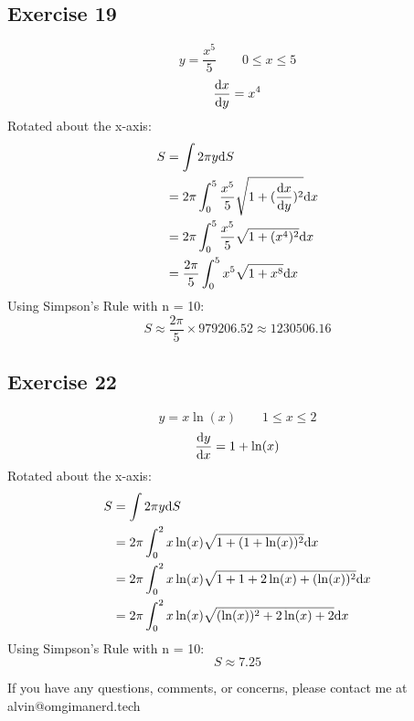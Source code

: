 \documentclass[letterpaper, 12pt]{math}
\begin{document}
\subsection*{Exercise 19}
\[ y = \frac{x^{5}}{5} \quad \quad 0 \leq x \leq 5 \]
\[ \frac{\mathrm{d}{x}}{\mathrm{d}{y}} = x^{4} \]
Rotated about the x-axis:
\begin{align*}
  S &= \int{2\pi y\mathrm{d}{S}} \\
  &= 2\pi\int_{0}^{5}{
    \frac{x^{5}}{5}\sqrt{1+(\frac{\mathrm{d}{x}}{\mathrm{d}{y}})^{2}}\mathrm{d}{x}} \\
  &= 2\pi\int_{0}^{5}{\frac{x^{5}}{5}\sqrt{1+(x^{4})^{2}}\mathrm{d}{x}} \\
  &= \frac{2\pi}{5}\int_{0}^{5}{x^{5}\sqrt{1+x^{8}}\mathrm{d}{x}} \\
\end{align*}
Using Simpson's Rule with n = 10:
\[ S \approx \frac{2\pi}{5} \times 979206.52 \approx 1230506.16 \]

\subsection*{Exercise 22}
\[ y = x\ln(x) \quad \quad 1 \leq x \leq 2 \]
\[ \frac{\mathrm{d}{y}}{\mathrm{d}{x}} = 1+\ln(x) \]
Rotated about the x-axis:
\begin{align*}
  S &= \int{2\pi y\mathrm{d}{S}} \\
  &= 2\pi\int_{0}^{2}{x\ln(x)\sqrt{1+(1+\ln(x))^{2}}\mathrm{d}{x}} \\
  &= 2\pi\int_{0}^{2}{x\ln(x)\sqrt{1+1+2\ln(x)+(\ln(x))^{2}}\mathrm{d}{x}} \\
  &= 2\pi\int_{0}^{2}{x\ln(x)\sqrt{(\ln(x))^{2}+2\ln(x)+2}\mathrm{d}{x}}
\end{align*}
Using Simpson's Rule with n = 10:
\[ S \approx 7.25 \]

\begin{center}
  If you have any questions, comments, or concerns, please contact me at
  alvin@omgimanerd.tech
\end{center}
\end{document}
